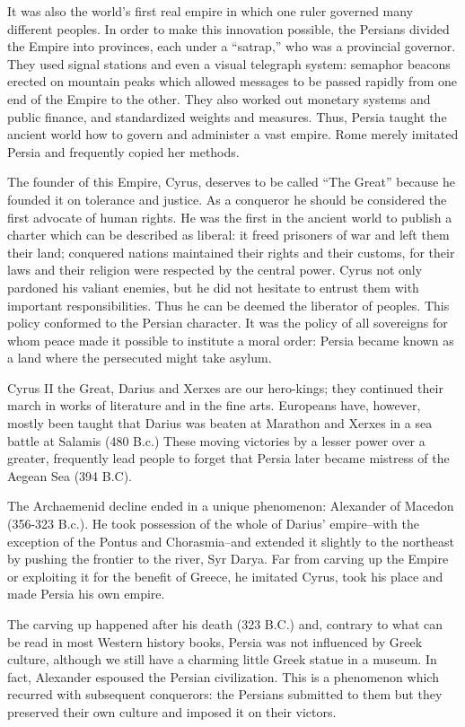 It was also the world’s first real empire in which one ruler governed many different peoples. In order to make this innovation possible, the Persians divided the Empire into provinces, each under a “satrap,” who was a provincial governor. They used signal stations and even a visual telegraph system: semaphor beacons erected on mountain peaks which allowed messages to be passed rapidly from one end of the Empire to the other. They also worked out monetary systems and public finance, and standardized weights and measures. Thus, Persia taught the ancient world how to govern and administer a vast empire. Rome merely imitated Persia and frequently copied her methods. 

The founder of this Empire, Cyrus, deserves to be called “The Great” because he founded it on tolerance and justice. As a conqueror he should be considered the first advocate of human rights. He was the first in the ancient world to publish a charter which can be described as liberal: it freed prisoners of war and left them their land; conquered nations maintained their rights and their customs, for their laws and their religion were respected by the central power. Cyrus not only pardoned his valiant enemies, but he did not hesitate to entrust them with important responsibilities. Thus he can be deemed the liberator of peoples. This policy conformed to the Persian character. It was the policy of all sovereigns for whom peace made it possible to institute a moral order: Persia became known as a land where the persecuted might take asylum. 

Cyrus II the Great, Darius and Xerxes are our hero-kings; they continued their march in works of literature and in the fine arts. Europeans have, however, mostly been taught that Darius was beaten at Marathon and Xerxes in a sea battle at Salamis (480 B.c.) These moving victories by a lesser power over a greater, frequently lead people to forget that Persia later became mistress of the Aegean Sea (394 B.C). 

The Archaemenid decline ended in a unique phenomenon: Alexander of Macedon (356-323 B.c.). He took possession of the whole of Darius’ empire--with the exception of the Pontus and Chorasmia--and extended it slightly to the northeast by pushing the frontier to the river, Syr Darya. Far from carving up the Empire or exploiting it for the benefit of Greece, he imitated Cyrus, took his place and made Persia his own empire. 

The carving up happened after his death (323 B.C.) and, contrary to what can be read in most Western history books, Persia was not influenced by Greek culture, although we still have a charming little Greek statue in a museum. In fact, Alexander espoused the Persian civilization. This is a phenomenon which recurred with subsequent conquerors: the Persians submitted to them but they preserved their own culture and imposed it on their victors. 

